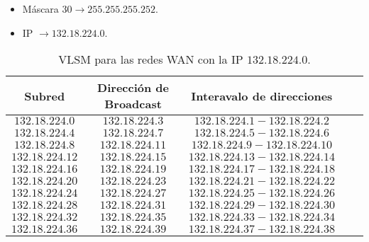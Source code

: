 \begin{itemize}
    \item Máscara \(30 \rightarrow 255.255.255.252 \).
    \item IP \(\rightarrow 132.18.224.0 \).
\end{itemize}

\begin{table}[ht]
    \centering
    \caption{VLSM para las redes WAN con la IP \(132.18.224.0\).}
    \begin{tabular}[t]{ccccc}
        \toprule
        \color{EAFIT-blue}\textbf{Subred} & \color{EAFIT-blue}\textbf{Dirección de Broadcast} & \color{EAFIT-blue}\textbf{Interavalo de direcciones} \\
        \midrule
        \(132.18.224.0\)                  & \(132.18.224.3\)                                  & \(132.18.224.1 - 132.18.224.2\)                      \\
        \(132.18.224.4\)                  & \(132.18.224.7\)                                  & \(132.18.224.5 - 132.18.224.6\)                      \\
        \(132.18.224.8\)                  & \(132.18.224.11\)                                 & \(132.18.224.9 - 132.18.224.10\)                     \\
        \(132.18.224.12\)                 & \(132.18.224.15\)                                 & \(132.18.224.13 - 132.18.224.14\)                    \\
        \(132.18.224.16\)                 & \(132.18.224.19\)                                 & \(132.18.224.17 - 132.18.224.18\)                    \\
        \(132.18.224.20\)                 & \(132.18.224.23\)                                 & \(132.18.224.21 - 132.18.224.22\)                    \\
        \(132.18.224.24\)                 & \(132.18.224.27\)                                 & \(132.18.224.25 - 132.18.224.26\)                    \\
        \(132.18.224.28\)                 & \(132.18.224.31\)                                 & \(132.18.224.29 - 132.18.224.30\)                    \\
        \(132.18.224.32\)                 & \(132.18.224.35\)                                 & \(132.18.224.33 - 132.18.224.34\)                    \\
        \(132.18.224.36\)                 & \(132.18.224.39\)                                 & \(132.18.224.37 - 132.18.224.38\)                    \\
        \bottomrule
    \end{tabular}
    \label{table: VLSM WAN}
\end{table}

